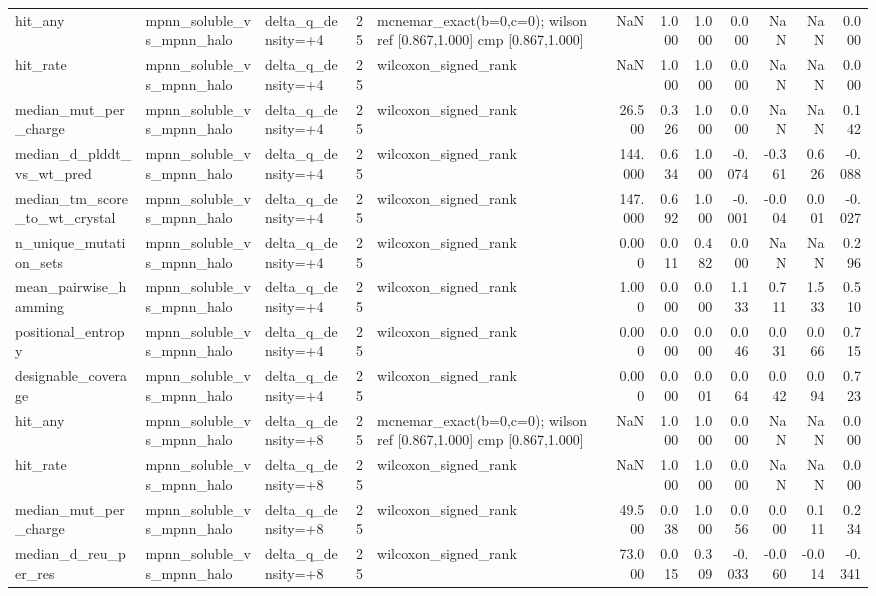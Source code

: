 \begin{table}
{\begin{tabular}{lllrlrrrrrrr}
hit\_any & mpnn\_soluble\_vs\_mpnn\_halo & delta\_q\_density=+4 & 25 & mcnemar\_exact(b=0,c=0); wilson ref [0.867,1.000] cmp [0.867,1.000] & NaN & 1.000 & 1.000 & 0.000 & NaN & NaN & 0.000 \\
hit\_rate & mpnn\_soluble\_vs\_mpnn\_halo & delta\_q\_density=+4 & 25 & wilcoxon\_signed\_rank & NaN & 1.000 & 1.000 & 0.000 & NaN & NaN & 0.000 \\
median\_mut\_per\_charge & mpnn\_soluble\_vs\_mpnn\_halo & delta\_q\_density=+4 & 25 & wilcoxon\_signed\_rank & 26.500 & 0.326 & 1.000 & 0.000 & NaN & NaN & 0.142 \\
median\_d\_plddt\_vs\_wt\_pred & mpnn\_soluble\_vs\_mpnn\_halo & delta\_q\_density=+4 & 25 & wilcoxon\_signed\_rank & 144.000 & 0.634 & 1.000 & -0.074 & -0.361 & 0.626 & -0.088 \\
median\_tm\_score\_to\_wt\_crystal & mpnn\_soluble\_vs\_mpnn\_halo & delta\_q\_density=+4 & 25 & wilcoxon\_signed\_rank & 147.000 & 0.692 & 1.000 & -0.001 & -0.004 & 0.001 & -0.027 \\
n\_unique\_mutation\_sets & mpnn\_soluble\_vs\_mpnn\_halo & delta\_q\_density=+4 & 25 & wilcoxon\_signed\_rank & 0.000 & 0.011 & 0.482 & 0.000 & NaN & NaN & 0.296 \\
mean\_pairwise\_hamming & mpnn\_soluble\_vs\_mpnn\_halo & delta\_q\_density=+4 & 25 & wilcoxon\_signed\_rank & 1.000 & 0.000 & 0.000 & 1.133 & 0.711 & 1.533 & 0.510 \\
positional\_entropy & mpnn\_soluble\_vs\_mpnn\_halo & delta\_q\_density=+4 & 25 & wilcoxon\_signed\_rank & 0.000 & 0.000 & 0.000 & 0.046 & 0.031 & 0.066 & 0.715 \\
designable\_coverage & mpnn\_soluble\_vs\_mpnn\_halo & delta\_q\_density=+4 & 25 & wilcoxon\_signed\_rank & 0.000 & 0.000 & 0.001 & 0.064 & 0.042 & 0.094 & 0.723 \\
hit\_any & mpnn\_soluble\_vs\_mpnn\_halo & delta\_q\_density=+8 & 25 & mcnemar\_exact(b=0,c=0); wilson ref [0.867,1.000] cmp [0.867,1.000] & NaN & 1.000 & 1.000 & 0.000 & NaN & NaN & 0.000 \\
hit\_rate & mpnn\_soluble\_vs\_mpnn\_halo & delta\_q\_density=+8 & 25 & wilcoxon\_signed\_rank & NaN & 1.000 & 1.000 & 0.000 & NaN & NaN & 0.000 \\
median\_mut\_per\_charge & mpnn\_soluble\_vs\_mpnn\_halo & delta\_q\_density=+8 & 25 & wilcoxon\_signed\_rank & 49.500 & 0.038 & 1.000 & 0.056 & 0.000 & 0.111 & 0.234 \\
median\_d\_reu\_per\_res & mpnn\_soluble\_vs\_mpnn\_halo & delta\_q\_density=+8 & 25 & wilcoxon\_signed\_rank & 73.000 & 0.015 & 0.309 & -0.033 & -0.060 & -0.014 & -0.341 \\

\end{tabular}}
\end{table}
